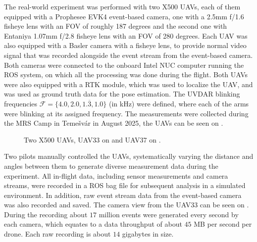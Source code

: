 The real-world experiment was performed with two X500 \ac{UAV}s, each of them equipped with a Prophesee EVK4 event-based camera, one with a 2.5mm f/1.6
fisheye lens with an \ac{FOV} of roughly 187 degrees and the second one with Entaniya 1.07mm f/2.8 fisheye lens with an \ac{FOV} of 280 degrees.
Each UAV was also equipped with a Basler camera with a fisheye lens, to provide normal video signal that was recorded alongside the event stream
from the event-based camera.
Both cameras were connected to the onboard Intel NUC computer running the \ac{ROS} system, on which all the processing was done during the flight. Both 
\ac{UAV}s were also equipped with a \ac{RTK} module, which was used to localize the \ac{UAV}, and was used as ground truth data for the pose estimation.
The UVDAR blinking frequencies $\mathcal{F} = \{4.0, 2.0, 1.\overline{3}, 1.0\}$ (in kHz) were defined, where each of the arms were blinking at its assigned
frequency.
The measurements were collected during the \ac{MRS} Camp in Temešvár in August 2025, the \ac{UAV}s can be seen on .
\begin{figure}[H]
	\centering
	\caption{
		Two X500 UAVs, UAV33 on  and UAV37 on .
  }
	\label{fig:uav33_37}
\end{figure}
Two pilots manually controlled the \ac{UAV}s, systematically varying the distance and angles between them to generate diverse measurement data during the experiment. All in-flight data, including sensor measurements and camera streams, were recorded in a \ac{ROS} bag file for subsequent analysis
in a simulated environment. In addition, raw event stream data from the event-based camera was also recorded and saved. The camera view from the UAV33
can be seen on . During the recording about $17$ million events were generated every second by each camera, which equates to a data
throughput of about $45$ MB per second per drone. Each raw recording is about $14$ gigabytes in size.

